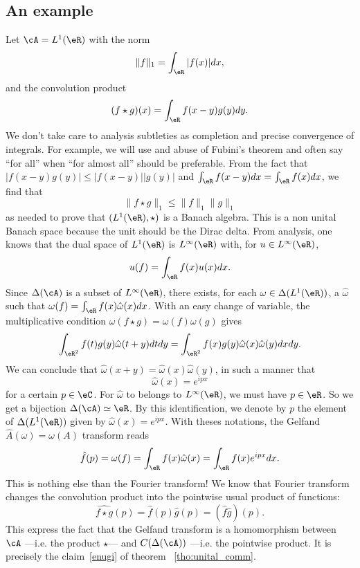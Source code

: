\subsection{An example}

Let $\cA=L^1(\eR)$ with the norm
\[
  \|f\|_1=\int_{\eR}|f(x)|dx,
\]
and the convolution product
\[
   (f\star g)(x)=\int_{\eR}f(x-y)g(y)dy.
\]
We don't take care to analysis subtleties as completion and precise convergence of integrals. For example, we will use and abuse of Fubini's theorem and often say ``for all'' when ``for almost all'' should be preferable. From the fact that $|f(x-y)g(y)|\leq|f(x-y)||g(y)|$ and $\int_{\eR}f(x-y)dx=\int_{\eR}f(x)dx$, we find that
\[
   \|f\star g\|_1\leq \|f\|_1\|g\|_1
\]
as needed to prove that $(L^1(\eR),\star)$ is a Banach algebra. This is a non unital Banach space because the unit should be the Dirac delta. From analysis, one knows that the dual space of $L^1(\eR)$ is $L^{\infty}(\eR)$ with, for $u\in L^{\infty}(\eR)$,
\[
  u(f)=\int_{\eR}f(x)u(x)dx.
\]
Since $\Delta(\cA)$ is a subset of $L^{\infty}(\eR)$, there exists, for each $\omega\in\Delta(L^1(\eR))$, a $\hat{\omega}$ such that $\omega(f)=\int_{\eR}f(x)\hat{\omega}(x)dx$. With an easy change of variable, the multiplicative condition $\omega(f\star g)=\omega(f)\omega(g)$ gives
\[
\int_{\eR^2}f(t)g(y)\hat{\omega}(t+y)dtdy=\int_{\eR^2}f(x)g(y)\hat{\omega}(x)\hat{\omega}(y)dxdy.
\]
We can conclude that $\hat{\omega}(x+y)=\hat{\omega}(x)\hat{\omega}(y)$, in such a manner that
\[
\hat{\omega}(x)=e^{ipx}
\]
for a certain $p\in\eC$. For $\hat{\omega}$ to belongs to $L^{\infty}(\eR)$, we must have $p\in\eR$. So we get a bijection $\Delta(\cA)\simeq\eR$. By this identification, we denote by $p$ the element of $\Delta(L^1(\eR))$ given by $\hat{\omega}(x)=e^{ipx}$. With theses notations, the Gelfand $\hat A(\omega)=\omega(A)$ transform reads
\begin{equation}
  \hat f(p)=\omega(f)=\int_{\eR}f(x)\hat{\omega}(x)
                     =\int_{\eR}f(x)e^{ipx}dx.
\end{equation}
This is nothing else than the Fourier transform! We know that Fourier transform changes the convolution product into the pointwise usual product of functions:
\[
\widehat{f\star g}(p)=\hat f(p)\hat g(p)=(\hat f\hat g)(p).
\]
This express the fact that the Gelfand transform is a homomorphism between $\cA$ ---i.e. the product $\star$--- and $C(\Delta(\cA))$ ---i.e. the pointwise product. It is precisely the claim~\ref{enugi} of theorem ~\ref{tho:unital_comm}.


